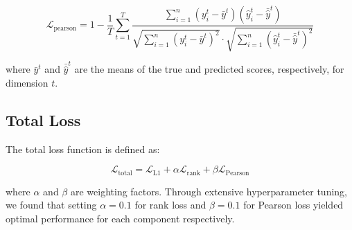 \documentclass[12pt]{article}
\begin{document}
\begin{equation}
    \mathcal{L}_{\text{pearson}} = 1 - \frac{1}{T} \sum_{t=1}^T \frac{\sum_{i=1}^n (y_i^t - \bar{y}^t)(\hat{y}_i^t - \bar{\hat{y}}^t)}{\sqrt{\sum_{i=1}^n (y_i^t - \bar{y}^t)^2} \cdot \sqrt{\sum_{i=1}^n (\hat{y}_i^t - \bar{\hat{y}}^t)^2}}
\end{equation}

where $\bar{y}^t$ and $\bar{\hat{y}}^t$ are the means of the true and predicted scores, respectively, for dimension $t$.

\subsection{Total Loss}
The total loss function is defined as:

\begin{equation}
\mathcal{L}_{\text{total}} = \mathcal{L}_{\text{L1}} + \alpha \mathcal{L}_{\text{rank}} + \beta \mathcal{L}_{\text{Pearson}}
\end{equation}

where $\alpha$ and $\beta$ are weighting factors. Through extensive hyperparameter tuning, we found that setting $\alpha=0.1$ for rank loss and $\beta=0.1$ for Pearson loss yielded optimal performance for each component respectively.
\end{document}
